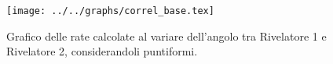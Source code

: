 \begin{figure}[h] \centering\texttt{[image: ../../graphs/correl\_base.tex]}\caption{Grafico delle rate calcolate al variare dell'angolo tra Rivelatore 1 e Rivelatore 2, considerandoli puntiformi.}\label{gr:correl_base} \end{figure}
